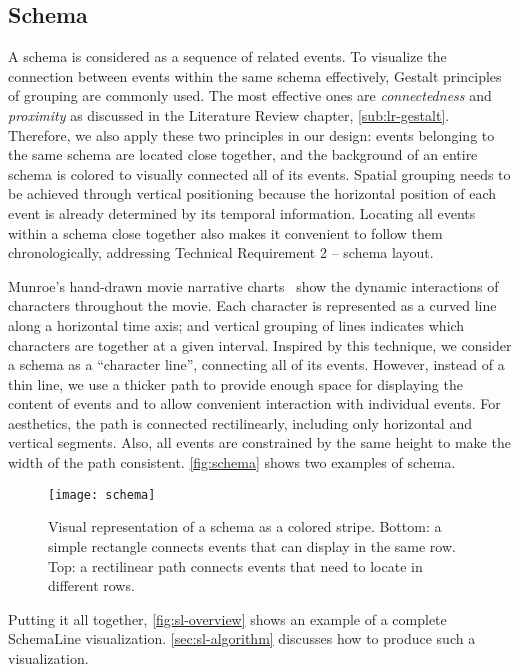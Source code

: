 \subsection{Schema}
\label{sub:schema}
A schema is considered as a sequence of related events. To visualize the connection between events within the same schema effectively, Gestalt principles of grouping are commonly used. The most effective ones are \emph{connectedness} and \emph{proximity} as discussed in the Literature Review chapter, \autoref{sub:lr-gestalt}. Therefore, we also apply these two principles in our design: events belonging to the same schema are located close together, and the background of an entire schema is colored to visually connected all of its events. Spatial grouping needs to be achieved through vertical positioning because the horizontal position of each event is already determined by its temporal information. Locating all events within a schema close together also makes it convenient to follow them chronologically, addressing Technical Requirement 2 -- schema layout.

Munroe's hand-drawn movie narrative charts~\cite{Munroe2009} show the dynamic interactions of characters throughout the movie. Each character is represented as a curved line along a horizontal time axis; and vertical grouping of lines indicates which characters are together at a given interval. Inspired by this technique, we consider a schema as a ``character line'', connecting all of its events. However, instead of a thin line, we use a thicker path to provide enough space for displaying the content of events and to allow convenient interaction with individual events. For aesthetics, the path is connected rectilinearly, including only horizontal and vertical segments. Also,  all events are constrained by the same height to make the width of the path consistent. \autoref{fig:schema} shows two examples of schema.

\begin{figure}
	\centering
	\texttt{[image: schema]}
	\caption[Visual representation of a schema]{Visual representation of a schema as a colored stripe. Bottom: a simple rectangle connects events that can display in the same row. Top: a rectilinear path connects events that need to locate in different rows.}
	\label{fig:schema}
\end{figure}

Putting it all together, \autoref{fig:sl-overview} shows an example of a complete SchemaLine visualization. \autoref{sec:sl-algorithm} discusses how to produce such a visualization.

